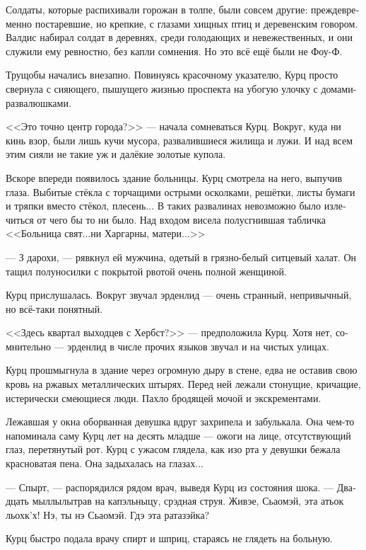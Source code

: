 \documentclass[a4paper,12pt,fleqn]{book}\usepackage{cooltooltips}\usepackage{polyglossia}\setdefaultlanguage[babelshorthands=true]{russian}\setotherlanguage{english}\defaultfontfeatures{Ligatures=TeX,Mapping=tex-text} \usepackage{xcolor}\definecolor{lightgray}{HTML}{bbbbbb}\color{lightgray}\newcommand{\ml}[3]{\textenglish{\textcolor{black}{#3}}}
\newcommand{\asterism}{\vspace{1em}{\centering\Large\bfseries$\ast~\ast~\ast$\par}\vspace{1em}}
\begin{document}
Солдаты, которые распихивали горожан в толпе, были совсем другие: преждевременно постаревшие, но крепкие, с глазами хищных птиц и деревенским говором.
Валдис набирал солдат в деревнях, среди голодающих и невежественных, и они служили ему ревностно, без капли сомнения.
Но это всё ещё были не Фоу-Ф.

\asterism

Трущобы начались внезапно.
Повинуясь красочному указателю, Курц просто свернула с сияющего, пышущего жизнью проспекта на убогую улочку с домами-развалюшками.

<<Это точно центр города?>> --- начала сомневаться Курц.
Вокруг, куда ни кинь взор, были лишь кучи мусора, развалившиеся жилища и лужи.
И над всем этим сияли не такие уж и далёкие золотые купола.

Вскоре впереди появилось здание больницы.
Курц смотрела на него, выпучив глаза.
Выбитые стёкла с торчащими острыми осколками, решётки, листы бумаги и тряпки вместо стёкол, плесень...
В таких развалинах невозможно было излечиться от чего бы то ни было.
Над входом висела полусгнившая табличка <<Больница свят...ни Харгарны, матери...>>

--- З дарохи, --- рявкнул ей мужчина, одетый в грязно-белый ситцевый халат.
Он тащил полуносилки с покрытой рвотой очень полной женщиной.

Курц прислушалась.
Вокруг звучал эрденлид --- очень странный, непривычный, но всё-таки понятный.

<<Здесь квартал выходцев с Хербст?>> --- предположила Курц.
Хотя нет, сомнительно --- эрденлид в числе прочих языков звучал и на чистых улицах.

Курц прошмыгнула в здание через огромную дыру в стене, едва не оставив свою кровь на ржавых металлических штырях.
Перед ней лежали стонущие, кричащие, истерически смеющиеся люди.
Пахло бродящей мочой и экскрементами.

Лежавшая у окна оборванная девушка вдруг захрипела и забулькала.
Она чем-то напоминала саму Курц лет на десять младше --- ожоги на лице, отсутствующий глаз, перетянутый рот.
Курц с ужасом глядела, как изо рта у девушки бежала красноватая пена.
Она задыхалась на глазах...

--- Спырт, --- распорядился рядом врач, выведя Курц из состояния шока.
--- Двадцать мыллылытрав на капэльныцу, срэдная струя.
Живэе, Сьаомэй, эта атьок льохк'х!
Нэ, ты нэ Сьаомэй.
Гдэ эта ратазэйка?

Курц быстро подала врачу спирт и шприц, стараясь не глядеть на больную.
\end{document}
